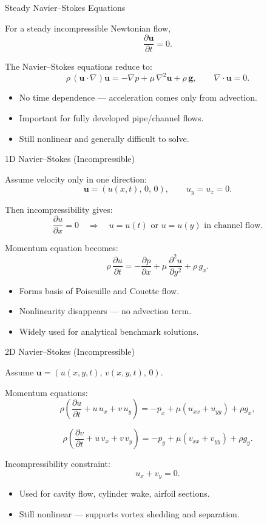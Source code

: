 \documentclass[aspectratio=169]{beamer}
\begin{document}
\begin{frame}{Steady Navier--Stokes Equations}

For a steady incompressible Newtonian flow, 
\[
\frac{\partial \mathbf{u}}{\partial t} = 0.
\]

The Navier--Stokes equations reduce to:
\[
\rho\,(\mathbf{u}\cdot\nabla)\mathbf{u}
=
-\nabla p
+ \mu\,\nabla^2 \mathbf{u}
+ \rho\,\mathbf{g},
\qquad
\nabla\cdot\mathbf{u} = 0.
\]

\begin{itemize}
  \item No time dependence — acceleration comes only from advection.
  \item Important for fully developed pipe/channel flows.
  \item Still nonlinear and generally difficult to solve.
\end{itemize}

\end{frame}

\begin{frame}{1D Navier--Stokes (Incompressible)}

Assume velocity only in one direction: 
\[
\mathbf{u} = (u(x,t),\,0,\,0),
\qquad
u_y = u_z = 0.
\]

Then incompressibility gives:
\[
\frac{\partial u}{\partial x} = 0
\quad\Rightarrow\quad
u = u(t) \text{ or } u = u(y) \text{ in channel flow.}
\]

Momentum equation becomes:
\[
\rho\,\frac{\partial u}{\partial t}
=
-\frac{\partial p}{\partial x}
+ \mu\,\frac{\partial^2 u}{\partial y^2}
+ \rho\,g_x.
\]

\begin{itemize}
  \item Forms basis of Poiseuille and Couette flow.
  \item Nonlinearity disappears — no advection term.
  \item Widely used for analytical benchmark solutions.
\end{itemize}

\end{frame}

\begin{frame}{2D Navier--Stokes (Incompressible)}

Assume $\mathbf{u} = (u(x,y,t),\, v(x,y,t),\, 0)$.

Momentum equations:
\[
\rho\left(
\frac{\partial u}{\partial t}
+ u\,u_x + v\,u_y
\right)
=
- p_x
+ \mu\left(u_{xx}+u_{yy}\right)
+ \rho g_x,
\]

\[
\rho\left(
\frac{\partial v}{\partial t}
+ u\,v_x + v\,v_y
\right)
=
- p_y
+ \mu\left(v_{xx}+v_{yy}\right)
+ \rho g_y.
\]

Incompressibility constraint:
\[
u_x + v_y = 0.
\]

\begin{itemize}
  \item Used for cavity flow, cylinder wake, airfoil sections.
  \item Still nonlinear — supports vortex shedding and separation.
\end{itemize}

\end{frame}
\end{document}
